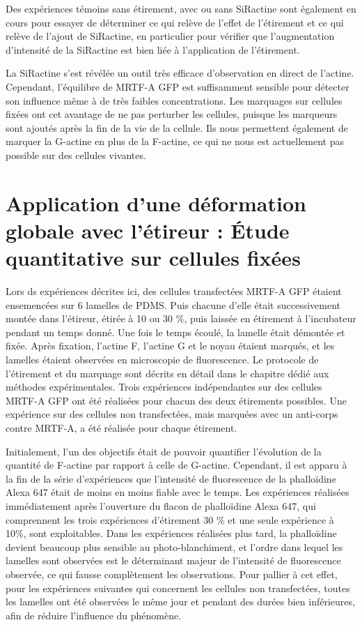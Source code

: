 Des expériences témoins sans étirement, avec ou sans SiRactine sont également en cours pour essayer de déterminer ce qui relève de l'effet de l'étirement et ce qui relève de l'ajout de SiRactine, en particulier pour vérifier que l'augmentation d'intensité de la SiRactine est bien liée à l'application de l'étirement. 

La SiRactine s'est révélée un outil très efficace d'observation en direct de l'actine. Cependant, l'équilibre de MRTF-A GFP est suffisamment sensible pour détecter son influence même à de très faibles concentrations. 
Les marquages sur cellules fixées ont cet avantage de ne pas perturber les cellules, puisque les marqueurs sont ajoutés après la fin de la vie de la cellule. 
Ils nous permettent également de marquer la G-actine en plus de la F-actine, ce qui ne nous est actuellement pas possible sur des cellules vivantes. 


\section{Application d'une déformation globale avec l'étireur : \'Etude quantitative sur cellules fixées}

Lors ds expériences décrites ici, des cellules transfectées MRTF-A GFP étaient ensemencées sur 6 lamelles de PDMS. Puis chacune d'elle était successivement montée dans l'étireur, étirée à 10 ou 30 \%, puis laissée en étirement à l'incubateur pendant un temps donné. Une fois le temps écoulé, la lamelle était démontée et fixée. Après fixation, l'actine F, l'actine G et le noyau étaient marqués, et les lamelles étaient observées en microscopie de fluorescence. Le protocole de l'étirement et du marquage sont décrits en détail dans le chapitre dédié aux méthodes expérimentales. 
Trois expériences indépendantes sur des cellules MRTF-A GFP ont été réalisées pour chacun des deux étirements possibles. Une expérience sur des cellules non transfectées, mais marquées avec un anti-corps contre MRTF-A, a été réalisée pour chaque étirement. 

Initialement, l'un des objectifs était de pouvoir quantifier l'évolution de la quantité de F-actine par rapport à celle de G-actine. Cependant, il est apparu à la fin de la série d'expériences que l'intensité de fluorescence de la phalloïdine Alexa 647 était de moins en moins fiable avec le temps. Les expériences réalisées immédiatement après l'ouverture du flacon de phalloïdine Alexa 647, qui comprennent les trois expériences d'étirement 30 \% et une seule expérience à 10\%, sont exploitables. Dans les expériences réalisées plus tard, la phalloïdine devient beaucoup plus sensible au photo-blanchiment, et l'ordre dans lequel les lamelles sont observées est le déterminant majeur de l'intensité de fluorescence observée, ce qui fausse complètement les observations. 
Pour pallier à cet effet, pour les expériences  suivantes qui concernent les cellules non transfectées, toutes les lamelles ont été observées le même jour et pendant des durées bien inférieures, afin de réduire l'influence du phénomène. 

